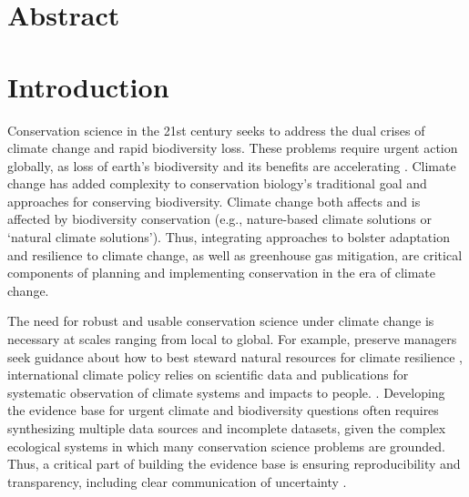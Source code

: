 \documentclass{article}
\begin{document}

\section*{Abstract} 



\newpage
\section* {Introduction}
\par Conservation science in the 21st century seeks to address the dual crises of  climate change and rapid biodiversity loss. These problems require urgent action globally, as loss of earth's biodiversity and its benefits are accelerating \citep{brondizio2019assessing, ripple2017extinction,tittensor2014mid}. Climate change has added complexity to conservation biology's traditional goal and approaches for conserving biodiversity. Climate change both affects and is affected by biodiversity conservation (e.g., nature-based climate solutions or `natural climate solutions'). %
Thus, integrating approaches to bolster adaptation and resilience to climate change, as well as greenhouse gas mitigation, are critical components of planning and implementing conservation in the era of climate change.
\par The need for robust and usable conservation science under climate change is necessary at scales ranging from local to global. For example, preserve managers seek guidance about how to best steward natural resources for climate resilience \citep{Nadeau2015}, international climate policy relies on scientific data and publications for systematic observation of climate systems and impacts to people. \cite{ipcc2007}. Developing the evidence base for urgent climate and biodiversity questions often requires synthesizing multiple data sources and incomplete datasets, given the complex ecological systems in which many conservation science problems are grounded. Thus, a critical part of building the evidence base is ensuring reproducibility and transparency, including clear communication of uncertainty \citep{ellis2024principles,ipcc2007}. %
\end{document}
